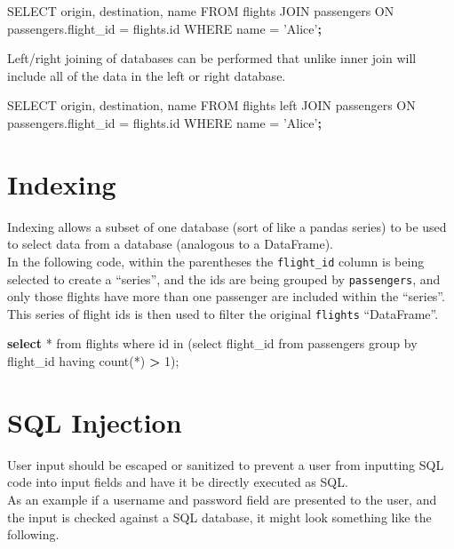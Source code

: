 \documentclass[]{book}
\newenvironment{Shaded}{\begin{snugshade}}{\end{snugshade}}
\newcommand{\KeywordTok}[1]{\textcolor[rgb]{0.13,0.29,0.53}{\textbf{#1}}}
\newcommand{\StringTok}[1]{\textcolor[rgb]{0.31,0.60,0.02}{#1}}
\newcommand{\OperatorTok}[1]{\textcolor[rgb]{0.81,0.36,0.00}{\textbf{#1}}}
\newcommand{\ExtensionTok}[1]{#1}
\newcommand{\NormalTok}[1]{#1}
\begin{document}
\begin{Shaded}
\begin{Highlighting}[]
\ExtensionTok{SELECT}\NormalTok{ origin, destination, name FROM flights JOIN passengers ON passengers.flight_id = flights.id WHERE name = }\StringTok{'Alice'}\KeywordTok{;}
\end{Highlighting}
\end{Shaded}

Left/right joining of databases can be performed that unlike inner join
will include all of the data in the left or right database.

\begin{Shaded}
\begin{Highlighting}[]
\ExtensionTok{SELECT}\NormalTok{ origin, destination, name FROM flights left JOIN passengers ON passengers.flight_id = flights.id WHERE name = }\StringTok{'Alice'}\KeywordTok{;}
\end{Highlighting}
\end{Shaded}

\section{Indexing}\label{indexing}

Indexing allows a subset of one database (sort of like a pandas series)
to be used to select data from a database (analogous to a DataFrame).\\
In the following code, within the parentheses the \texttt{flight\_id}
column is being selected to create a ``series'', and the ids are being
grouped by \texttt{passengers}, and only those flights have more than
one passenger are included within the ``series''. This series of flight
ids is then used to filter the original \texttt{flights} ``DataFrame''.

\begin{Shaded}
\begin{Highlighting}[]
\KeywordTok{select} \ExtensionTok{*}\NormalTok{ from flights where id in (select flight_id from passengers group by flight_id having count(*) }\OperatorTok{>} \ExtensionTok{1}\NormalTok{);}
\end{Highlighting}
\end{Shaded}

\section{SQL Injection}\label{sql-injection}

User input should be escaped or sanitized to prevent a user from
inputting SQL code into input fields and have it be directly executed as
SQL.\\
As an example if a username and password field are presented to the
user, and the input is checked against a SQL database, it might look
something like the following.
\end{document}
